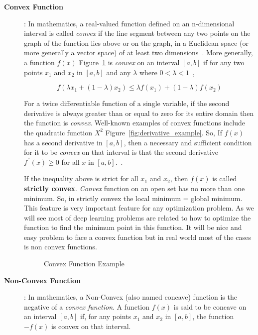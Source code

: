 \begin{description}
  \item [\textbf{Convex Function}]:  In mathematics, a real-valued function defined on an n-dimensional interval is called \textit{convex} if the line segment between any two points on the graph of the function lies above or on the graph, in a Euclidean space (or more generally a vector space) of at least two dimensions~\cite{Wiki_Convex_Function}. More generally, a function $f(x)$ Figure~\ref{fig:convex_function} is \textit{convex} on an interval $[a,b]$ if for any two points $x_1$ and $x_2$ in $[a,b]$ and any $\lambda$ where $0<\lambda<1$~\cite{Rudin_1976},

\begin{equation}\label{eq:convex_fun}
  f(\lambda x_1 + (1-\lambda)x_2) \leq \lambda f(x_1) + (1 - \lambda) f(x_2)
\end{equation}

For a twice differentiable function of a single variable, if the second derivative is always greater than or equal to zero for its entire domain then the function is \textit{convex}. Well-known examples of convex functions include the quadratic function $X^2$ Figure~\ref{fig:derivative_example}. So, If $f(x)$ has a second derivative in $[a,b]$, then a necessary and sufficient condition for it to be \textit{convex} on that interval is that the second derivative $f^{''}(x) \geq 0$ for all $x$ in $[a,b]$.~\cite{Wolfram_Convex}.

If the inequality above is strict for all $x_1$ and $x_2$, then $f(x)$ is called \textbf{strictly convex}. \textit{Convex} function on an open set has no more than one minimum. So, in strictly convex the local minimum = global minimum. This feature is very important feature for any optimization problem. As we will see most of deep learning problems are related to how to optimize the function to find the minimum point in this function. It will be nice and easy problem to face a convex function but in real world most of the cases is non convex functions.


\begin{figure}[!h]
\begin{center}


\caption{Convex Function Example }\label{fig:convex_function}
\end{center}
\end{figure} 



\item [\textbf{Non-Convex Function}]: In mathematics, a Non-Convex (also named concave) function is the negative of a \textit{convex function}. A function $f(x)$ is said to be concave on an interval  $[a,b]$ if, for any points $x_1$ and $x_2$ in $[a,b]$, the function  $-f(x)$ is convex on that interval.


\end{description}
